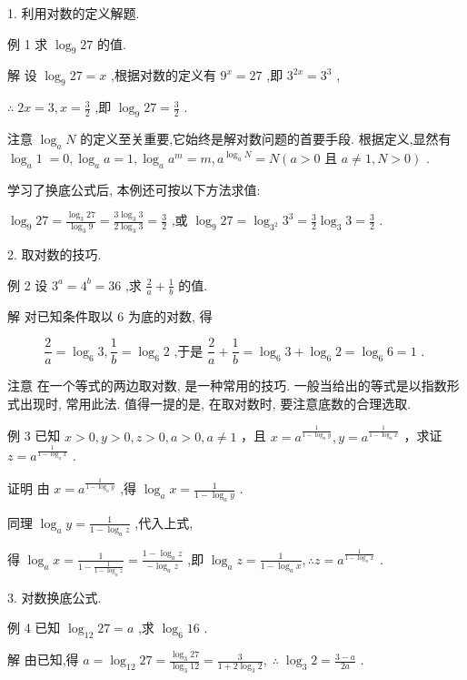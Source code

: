 \documentclass[10pt]{article}
\begin{document}
1. 利用对数的定义解题.

例 1 求 \({\log }_{9}{27}\) 的值.

解 设 \({\log }_{9}{27} = x\) ,根据对数的定义有 \({9}^{x} = {27}\) ,即 \({3}^{2x} = {3}^{3}\) ,

\(\therefore \;{2x} = 3,x = \frac{3}{2}\) ,即 \({\log }_{9}{27} = \frac{3}{2}\) .

注意 \({\log }_{a}N\) 的定义至关重要,它始终是解对数问题的首要手段. 根据定义,显然有 \({\log }_{a}1 \; = 0,{\log }_{a}a = 1,{\log }_{a}{a}^{m} = m,{a}^{{\log }_{a}N} = N\left( {a > 0\text{ 且 }a \neq  1,N > 0}\right)\) .

学习了换底公式后, 本例还可按以下方法求值:

\({\log }_{9}{27} = \frac{{\log }_{3}{27}}{{\log }_{3}9} = \frac{3{\log }_{3}3}{2{\log }_{3}3} = \frac{3}{2}\) ,或 \({\log }_{9}{27} = {\log }_{{3}^{2}}{3}^{3} = \frac{3}{2}{\log }_{3}3 = \frac{3}{2}\) .

2. 取对数的技巧.

例 2 设 \({3}^{a} = {4}^{b} = {36}\) ,求 \(\frac{2}{a} + \frac{1}{b}\) 的值.

解 对已知条件取以 6 为底的对数, 得

\[
\frac{2}{a} = {\log }_{6}3,\frac{1}{b} = {\log }_{6}2\text{ ,于是 }\frac{2}{a} + \frac{1}{b} = {\log }_{6}3 + {\log }_{6}2 = {\log }_{6}6 = 1\text{ . }
\]

注意 在一个等式的两边取对数, 是一种常用的技巧. 一般当给出的等式是以指数形式出现时, 常用此法. 值得一提的是, 在取对数时, 要注意底数的合理选取.

例 3 已知 \(x > 0,y > 0,z > 0,a > 0,a \neq  1\) ，且 \(x = {a}^{\frac{1}{1 - {\log }_{a}y}},y = {a}^{\frac{1}{1 - {\log }_{a}x}}\) ，求证 \(z = {a}^{\frac{1}{1 - {\log }_{a}x}}\) .

证明 由 \(x = {a}^{\frac{1}{1 - {\log }_{a}y}}\) ,得 \({\log }_{a}x = \frac{1}{1 - {\log }_{a}y}\) .

同理 \({\log }_{a}y = \frac{1}{1 - {\log }_{a}z}\) ,代入上式,

得 \({\log }_{a}x = \frac{1}{1 - \frac{1}{1 - {\log }_{a}z}} = \frac{1 - {\log }_{a}z}{-{\log }_{a}z}\) ,即 \({\log }_{a}z = \frac{1}{1 - {\log }_{a}x},\therefore z = {a}^{\frac{1}{1 - {\log }_{a}x}}\) .

3. 对数换底公式.

例 4 已知 \({\log }_{12}{27} = a\) ,求 \({\log }_{6}{16}\) .

解 由已知,得 \(a = {\log }_{12}{27} = \frac{{\log }_{3}{27}}{{\log }_{3}{12}} = \frac{3}{1 + 2{\log }_{3}2},\;\therefore \;{\log }_{3}2 = \frac{3 - a}{2a}\) .
\end{document}
